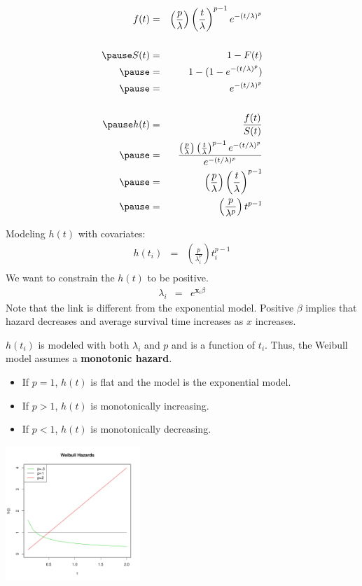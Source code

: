 \documentclass[handout]{beamer}
\begin{document}
\begin{frame}
\begin{eqnarray*}
f(t) &=& \left( \frac{p}{\lambda} \right) \left( \frac{t}{\lambda}
\right) ^ {p-1} e^{-(t/\lambda)^p} \\\\
\pause
S(t) &=& 1 - F(t) \\
\pause
&=& 1 - (1 - e^{-(t/\lambda)^p})\\
\pause
&=& e^{-(t/\lambda)^p}\\\\
\pause
h(t) &=& \frac{f(t)}{S(t)}\\
\pause
&=& \dfrac{\left( \frac{p}{\lambda} \right) \left( \frac{t}{\lambda}
\right) ^ {p-1} e^{-(t/\lambda)^p}}{e^{-(t/\lambda)^p}}\\
\pause
&=& \left( \frac{p}{\lambda} \right) \left( \frac{t}{\lambda}
\right) ^ {p-1}\\
\pause
&=& \left( \frac{p}{\lambda ^p} \right) t^{p-1}
\end{eqnarray*}
\end{frame}

\begin{frame}
Modeling $h(t)$ with covariates:
\pause
\begin{eqnarray*}
h(t_i) &=& \left( \frac{p}{\lambda_i ^p} \right) t_i^{p-1}\\
\end{eqnarray*}
\pause
We want to constrain the $h(t)$ to be positive.
\pause
\begin{eqnarray*}
\lambda_i &=& e^{\mathbf{x}_i \beta}
\end{eqnarray*}
\pause
Note that the link is different from the exponential model.  \pause Positive
$\beta$ implies that hazard decreases and average survival time increases as $x$ increases.\\
\end{frame}

\begin{frame}
$h(t_i)$ is modeled with both $\lambda_i$ and $p$ and is a function of
$t_i$. Thus, the
Weibull model assumes a \textbf{monotonic hazard}.
\pause
\begin{itemize}
\item If $p = 1$, $h(t)$ is flat and the model is the exponential
model.
\pause
\item If $p > 1$, $h(t)$ is monotonically increasing.
\pause
\item If $p < 1$, $h(t)$ is monotonically decreasing.
\end{itemize}
\pause
\begin{center}
\includegraphics[width = 2in, height = 2in]{survival_present-weibhaz.pdf}
\end{center}
\end{frame}
\end{document}
